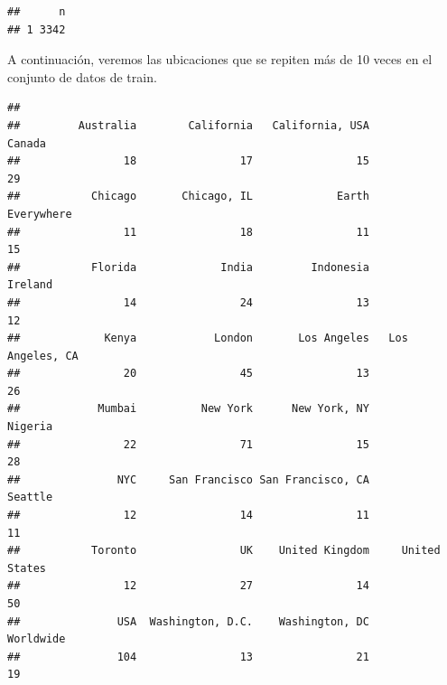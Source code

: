 \documentclass[]{article}
\newenvironment{Shaded}{\begin{snugshade}}{\end{snugshade}}
\newcommand{\DecValTok}[1]{\textcolor[rgb]{0.00,0.00,0.81}{#1}}
\newcommand{\KeywordTok}[1]{\textcolor[rgb]{0.13,0.29,0.53}{\textbf{#1}}}
\newcommand{\NormalTok}[1]{#1}
\newcommand{\OperatorTok}[1]{\textcolor[rgb]{0.81,0.36,0.00}{\textbf{#1}}}
\newcommand{\StringTok}[1]{\textcolor[rgb]{0.31,0.60,0.02}{#1}}
\begin{document}
\begin{Shaded}
\end{Shaded}

\begin{verbatim}
##      n
## 1 3342
\end{verbatim}

A continuación, veremos las ubicaciones que se repiten más de 10 veces
en el conjunto de datos de train.

\begin{Shaded}
\end{Shaded}

\begin{verbatim}
## 
##         Australia        California   California, USA            Canada 
##                18                17                15                29 
##           Chicago       Chicago, IL             Earth        Everywhere 
##                11                18                11                15 
##           Florida             India         Indonesia           Ireland 
##                14                24                13                12 
##             Kenya            London       Los Angeles   Los Angeles, CA 
##                20                45                13                26 
##            Mumbai          New York      New York, NY           Nigeria 
##                22                71                15                28 
##               NYC     San Francisco San Francisco, CA           Seattle 
##                12                14                11                11 
##           Toronto                UK    United Kingdom     United States 
##                12                27                14                50 
##               USA  Washington, D.C.    Washington, DC         Worldwide 
##               104                13                21                19
\end{verbatim}
\end{document}
